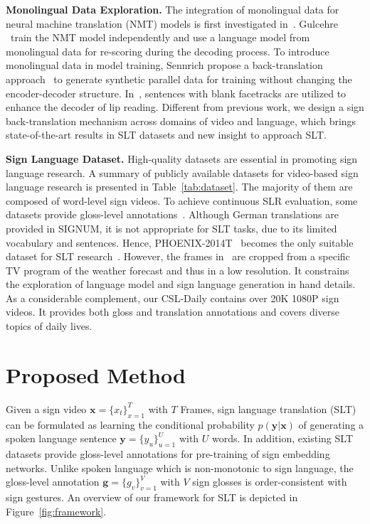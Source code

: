 \documentclass[final]{cvpr}
\begin{document}
\textbf{Monolingual Data Exploration.} 
The integration of monolingual data for neural machine translation (NMT) models is first investigated in~\cite{gulcehre2015using}. 
Gulcehre ~\etal train the NMT model independently and use a language model from monolingual data for re-scoring during the decoding process. 
To introduce monolingual data in model training, Sennrich \etal propose a back-translation approach~\cite{backtranslationACL16} to generate synthetic parallel data for training without changing the encoder-decoder structure. 
In~\cite{chung2017lip}, sentences with blank facetracks are utilized to enhance the decoder of lip reading. 
Different from previous work, we design a sign back-translation mechanism across domains of video and language, which brings state-of-the-art results in SLT datasets and new insight to approach SLT. 

\textbf{Sign Language Dataset.} 
High-quality datasets are essential in promoting sign language research. 
A summary of publicly available datasets for video-based sign language research is presented in Table~\ref{tab:dataset}. 
The majority of them are composed of word-level sign videos. 
To achieve continuous SLR evaluation, some datasets provide gloss-level annotations~\cite{huang18han,phoenix2014,signum07}. 
Although German translations are provided in SIGNUM, it is not appropriate for SLT tasks, due to its limited vocabulary and sentences. 
Hence, PHOENIX-2014T~\cite{slt-nslt-cihan18} becomes the only suitable dataset for SLT research~\cite{slt-trans-cihan20,tspnet-nips20}.  
However, the frames in~\cite{phoenix2014} are cropped from a specific TV program of the weather forecast and thus in a low resolution. 
It constrains the exploration of language model and sign language generation in hand details. 
As a considerable complement, 
our CSL-Daily contains over 20K 1080P sign videos. 
It provides both gloss and translation annotations and covers diverse topics of daily lives. 


\section{Proposed Method}
Given a sign video $\mathbf{x}=\{x_t\}^T_{x=1}$ with $T$ Frames, 
sign language translation (SLT) can be formulated as learning the conditional probability $p(\mathbf{y}|\mathbf{x})$ of generating a spoken language sentence $\mathbf{y}=\{y_u\}^U_{u=1}$ with $U$ words. 
In addition, existing SLT datasets provide gloss-level annotations for pre-training of sign embedding networks.
Unlike spoken language which is non-monotonic to sign language,  
the gloss-level annotation $\mathbf{g}=\{g_v\}^V_{v=1}$ with $V$ sign glosses is order-consistent with sign gestures. 
An overview of our framework for SLT is depicted in Figure~\ref{fig:framework}. 
\end{document}
